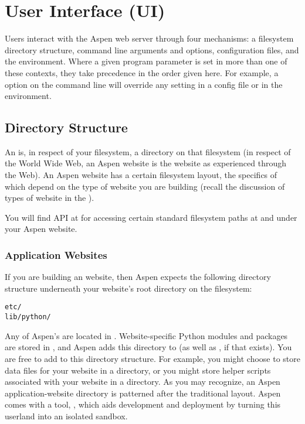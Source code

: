 \chapter{User Interface (UI) \label{interface}}

Users interact with the Aspen web server through four mechanisms: a filesystem
directory structure, command line arguments and options, configuration files,
and the environment. Where a given program parameter is set in more than one of
these contexts, they take precedence in the order given here. For example, a
 option on the command line will override any  setting in a
config file or in the environment.


\section{Directory Structure \label{directory-structure}}

An  is, in respect of your filesystem, a directory on that
filesystem (in respect of the World Wide Web, an Aspen website is the website as
experienced through the Web). An Aspen website has a certain filesystem layout,
the specifics of which depend on the type of website you are building (recall
the discussion of types of website in the
).

You will find API at  for accessing certain
standard filesystem paths at and under your Aspen website.


\subsection{Application Websites} \label{directories-application}

If you are building an  website, then Aspen expects the
following directory structure underneath your website's root directory on the
filesystem:

\begin{verbatim}
etc/
lib/python/
\end{verbatim}

Any of Aspen's  are located in
. Website-specific Python modules and packages are stored in
, and Aspen adds this directory to  (as well as
, if that exists). You are free to add to this
directory structure. For example, you might choose to store data files for your
website in a  directory, or you might store helper scripts associated
with your website in a  directory. As you may recognize, an Aspen
application-website directory is patterned after the traditional \UNIX{} layout.
Aspen comes with a tool, , which
aids development and deployment by turning this userland into an isolated
sandbox.

